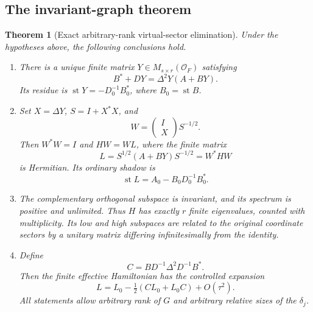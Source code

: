 \documentclass[11pt,oneside]{article}
\numberwithin{equation}{section}
\theoremstyle{plain}
\newtheorem{theorem}{Theorem}[section]
\theoremstyle{definition}
\theoremstyle{remark}
\newcommand{\OO}{\mathcal O}
\newcommand{\st}{\operatorname{st}}
\begin{document}
\subsection{The invariant-graph theorem}
\begin{theorem}[Exact arbitrary-rank virtual-sector elimination]\label{thm:elimination}
Under the hypotheses above, the following conclusions hold.

\begin{enumerate}[label=\textup{(\roman*)},leftmargin=2em,itemsep=3pt]
\item There is a unique finite matrix $Y\in M_{s\times r}(\OO_F)$ satisfying
\begin{equation}\label{eq:riccati}
 B^*+DY=\Delta^2Y(A+BY).
\end{equation}
Its residue is $\st Y=-D_0^{-1}B_0^*$, where $B_0=\st B$.
\item Set $X=\Delta Y$, $S=I+X^*X$, and
\begin{equation}\label{eq:W}
 W=\begin{pmatrix}I\\X\end{pmatrix}S^{-1/2}.
\end{equation}
Then $W^*W=I$ and $HW=WL$, where the finite matrix
\begin{equation}\label{eq:Kexact}
 L=S^{1/2}(A+BY)S^{-1/2}=W^*HW
\end{equation}
is Hermitian. Its ordinary shadow is
\begin{equation}\label{eq:Kshadow}
 \st L=A_0-B_0D_0^{-1}B_0^*.
\end{equation}
\item The complementary orthogonal subspace is invariant, and its spectrum is positive and unlimited. Thus $H$ has exactly $r$ finite eigenvalues, counted with multiplicity. Its low and high subspaces are related to the original coordinate sectors by a unitary matrix differing infinitesimally from the identity.
\item Define
\begin{equation}\label{eq:C}
 C=BD^{-1}\Delta^2D^{-1}B^*.
\end{equation}
Then the finite effective Hamiltonian has the controlled expansion
\begin{equation}\label{eq:Kcorrection}
 \boxed{\quad L=L_0-\tfrac12(CL_0+L_0C)+O(\tau^2).\quad}
\end{equation}
All statements allow arbitrary rank of $G$ and arbitrary relative sizes of the $\delta_j$.
\end{enumerate}
\end{theorem}
\end{document}
